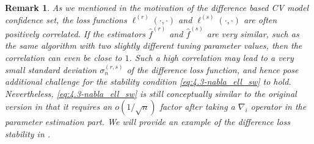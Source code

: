 \documentclass[11pt]{article}
\theoremstyle{plain}
\newtheorem{remark}[theorem]{Remark}
\begin{document}
\begin{remark}\label{rem:5.1-difference_loss_standardize}
As we mentioned in the motivation of the difference based CV model confidence set, the loss functions $\ell^{(r)}(\cdot,\cdot)$ and $\ell^{(s)}(\cdot,\cdot)$ are often positively correlated. If the estimators $\hat f^{(r)}$ and $\hat f^{(s)}$ are very similar, such as the same algorithm with two slightly different tuning parameter values, then the correlation can even be close to $1$. Such a high correlation may lead to a very small standard deviation  $\sigma_n^{(r,s)}$ of the difference loss function, and hence pose additional challenge for the stability condition \eqref{eq:4.3-nabla_ell_sw} to hold.  Nevertheless, \eqref{eq:4.3-nabla_ell_sw} is still conceptually similar to the original version in that it requires an $o(1/\sqrt{n})$ factor after taking a $\nabla_i$ operator in the parameter estimation part. We will provide an example of the difference loss stability in .
\end{remark}
\end{document}
